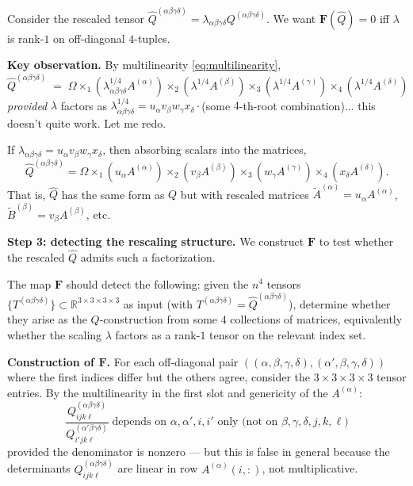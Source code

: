 Consider the rescaled tensor $\widehat Q^{(\alpha\beta\gamma\delta)}=\lambda_{\alpha\beta\gamma\delta}Q^{(\alpha\beta\gamma\delta)}$.  We want $\mathbf F(\widehat Q)=0$ iff $\lambda$ is rank-$1$ on off-diagonal $4$-tuples.

\medskip
\noindent\textbf{Key observation.}  By multilinearity \eqref{eq:multilinearity},
\[
\widehat Q^{(\alpha\beta\gamma\delta)} \;=\; \Omega\times_1(\lambda_{\alpha\beta\gamma\delta}^{1/4}A^{(\alpha)})\times_2(\lambda^{1/4}A^{(\beta)})\times_3(\lambda^{1/4}A^{(\gamma)})\times_4(\lambda^{1/4}A^{(\delta)})
\]
\emph{provided} $\lambda$ factors as $\lambda_{\alpha\beta\gamma\delta}^{1/4}=u_\alpha v_\beta w_\gamma x_\delta\cdot$(some $4$-th-root combination)... this doesn't quite work.  Let me redo.

If $\lambda_{\alpha\beta\gamma\delta}=u_\alpha v_\beta w_\gamma x_\delta$, then absorbing scalars into the matrices,
\[
\widehat Q^{(\alpha\beta\gamma\delta)}=\Omega\times_1(u_\alpha A^{(\alpha)})\times_2(v_\beta A^{(\beta)})\times_3(w_\gamma A^{(\gamma)})\times_4(x_\delta A^{(\delta)}).
\]
That is, $\widehat Q$ has the same form as $Q$ but with rescaled matrices $\widetilde A^{(\alpha)}=u_\alpha A^{(\alpha)}$, $\widetilde B^{(\beta)}=v_\beta A^{(\beta)}$, etc.

\medskip
\noindent\textbf{Step 3: detecting the rescaling structure.}  We construct $\mathbf F$ to test whether the rescaled $\widehat Q$ admits such a factorization.

\medskip
The map $\mathbf F$ should detect the following: given the $n^4$ tensors $\{T^{(\alpha\beta\gamma\delta)}\}\subset\mathbb R^{3\times 3\times 3\times 3}$ as input (with $T^{(\alpha\beta\gamma\delta)}=\widehat Q^{(\alpha\beta\gamma\delta)}$), determine whether they arise as the $Q$-construction from some $4$ collections of matrices, equivalently whether the scaling $\lambda$ factors as a rank-$1$ tensor on the relevant index set.

\medskip
\noindent\textbf{Construction of $\mathbf F$.}  For each off-diagonal pair $((\alpha,\beta,\gamma,\delta),(\alpha',\beta,\gamma,\delta))$ where the first indices differ but the others agree, consider the $3\times 3\times 3\times 3$ tensor entries.  By the multilinearity in the first slot and genericity of the $A^{(\alpha)}$:
\[
\frac{Q^{(\alpha\beta\gamma\delta)}_{ijk\ell}}{Q^{(\alpha'\beta\gamma\delta)}_{i'jk\ell}} \;\text{depends on }\alpha,\alpha',i,i'\text{ only (not on }\beta,\gamma,\delta,j,k,\ell\text{)}
\]
provided the denominator is nonzero — but this is false in general because the determinants $Q^{(\alpha\beta\gamma\delta)}_{ijk\ell}$ are linear in row $A^{(\alpha)}(i,:)$, not multiplicative.

